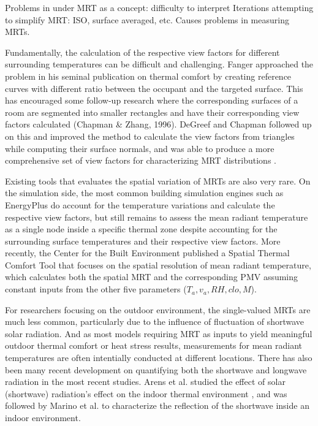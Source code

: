     Problems in under MRT as a concept: difficulty to interpret Iterations attempting to simplify MRT: ISO, surface averaged, etc. Causes problems in measuring MRTs. 

    Fundamentally, the calculation of the respective view factors for different surrounding temperatures can be difficult and challenging. Fanger approached the problem in his seminal publication on thermal comfort \cite{fanger_thermal_1970} by creating reference curves with different ratio between the occupant and the targeted surface. This has encouraged some follow-up research where the corresponding surfaces of a room are segmented into smaller rectangles and have their corresponding view factors calculated (Chapman \& Zhang, 1996). DeGreef and Chapman followed up on this and improved the method to calculate the view factors from triangles while computing their surface normals, and was able to produce a more comprehensive set of view factors for characterizing MRT distributions \cite{degreef_calculation_2017}. 

    Existing tools that evaluates the spatial variation of MRTs are also very rare. On the simulation side, the most common building simulation engines such as EnergyPlus \cite{energyplus_engineering_2013} do account for the temperature variations and calculate the respective view factors, but still remains to assess the mean radiant temperature as a single node inside a specific thermal zone despite accounting for the surrounding surface temperatures and their respective view factors. More recently, the Center for the Built Environment published a Spatial Thermal Comfort Tool \cite{arens_modeling_2015} that focuses on the spatial resolution of mean radiant temperature, which calculates both the spatial MRT and the corresponding PMV assuming constant inputs from the other five parameters ($T_a, v_a, RH, clo, M$).  

    For researchers focusing on the outdoor environment, the single-valued MRTs are much less common, particularly due to the influence of fluctuation of shortwave solar radiation\cite{middel_sky_2017}. And as most models requiring MRT as inputs to yield meaningful outdoor thermal comfort or heat stress results, measurements for mean radiant temperatures are often intentially conducted at different locations\cite{thorsson_different_2007,thorsson_thermal_2007}. There has also been many recent development on quantifying both the shortwave and longwave radiation in the most recent studies. Arens et al. studied the effect of solar (shortwave) radiation's effect on the indoor thermal environment \cite{arens_modeling_2015-1}, and was followed by Marino et al. to characterize the reflection of the shortwave inside an indoor environment\cite{marino_effect_2017}.      
